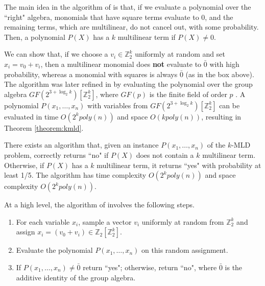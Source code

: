 The main idea in the algorithm of \cite{koutis:icalp08} is that, if we evaluate a polynomial 
over the ``right" algebra, monomials that have square terms evaluate to 0, and the remaining terms,
which are multilinear, do not cancel out, with some probability.
Then, a polynomial $P(X)$ has a $k$ multilinear term if $P(X) \neq 0$. 

We can show that, if we choose a $v_i \in \mathbb{Z}_2^k$ uniformly at random and set $x_i = v_0 + v_i$, then a multilinear monomial does \textbf{not} evaluate to $\bar 0$ with high probability, whereas a monomial with squares is always $\bar 0$ (as in the box above).
The algorithm was later refined in \cite{williams2009finding} by evaluating the polynomial over the group algebra $GF(2^{3 + \log_2k})[\mathbb{Z}_2^k]$, where $GF(p)$ is the finite field of order $p$ \cite{mullen2007finite}. A polynomial $P(x_1,\ldots,x_n)$ with variables from $GF(2^{3 + \log_2k})[\mathbb{Z}_2^k]$ can be evaluated in time $O(2^k poly(n))$ and space $O(kpoly(n))$, resulting in Theorem \ref{theorem:kmld}.

\begin{theorem}
\label{theorem:kmld}
There exists an algorithm that, given an instance $P(x_1,\ldots,x_n)$ of the \textsc{$k$-MLD} problem, correctly returns ``no" if $P(X)$ does not contain a $k$ multilinear term. Otherwise, if $P(X)$ has a $k$ multilinear term, it returns ``yes" with probability at least 1/5. 
The algorithm has time complexity $O(2^k poly(n))$ and space complexity $O(2^k poly(n))$.
\end{theorem}

At a high level, the algorithm of \cite{koutis:icalp08} involves the following steps.
\begin{enumerate}
\item For each variable $x_i$, sample a vector $v_i$ uniformly at random from $\mathbb{Z}_2^k$ and assign $x_i = (v_0 + v_i) \in \mathbb{Z}_2[\mathbb{Z}_2^k]$.
\item Evaluate the polynomial $P(x_1,\ldots,x_n)$ on this random assignment.
\item If $P(x_1,\ldots,x_n) \neq \bar{0}$ return ``yes"; otherwise, return ``no",
where $\bar{0}$ is the additive identity of the group algebra.
\end{enumerate}


